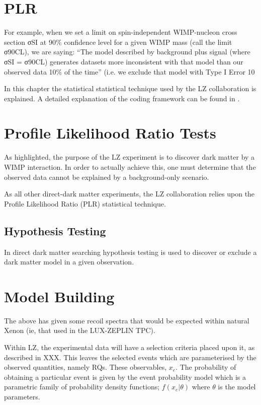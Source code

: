\section{PLR}
\par
For example, when we set a limit on spin-independent WIMP-nucleon cross section σSI at 90\% confidence level for a given WIMP mass (call the limit σ90CL), we are saying:
“The model described by background plus signal (where σSI  = σ90CL) generates datasets more inconsistent with that model than our observed data 10\% of the time” (i.e. we exclude that model with Type I Error 10%






\par
In this chapter the statistical statistical technique used by the LZ collaboration is explained.
A detailed explanation of the coding framework can be found in \cite{LZ_Ibles_LZStats_Thesis_ref}.

\section{Profile Likelihood Ratio Tests}
\par
As highlighted, the purpose of the LZ experiment is to discover dark matter by a WIMP interaction.
In order to actually achieve this, one must determine that the observed data cannot be explained by a background-only scenario.

\par
As all other direct-dark matter experiments, the LZ collaboration relies upon the Profile Likelihood Ratio (PLR) statistical technique.


\subsection{Hypothesis Testing}
\par
In direct dark matter searching hypothesis testing is used to discover or exclude a dark matter model in a given observation.



\section{Model Building}
\par
The above has given some recoil spectra that would be expected within natural Xenon (ie, that used in the LUX-ZEPLIN TPC).

\par
Within LZ, the experimental data will have a selection criteria placed upon it, as described in XXX.
This leaves the selected events which are parameterised by the observed quantities, namely RQs.
These observables, $x_{e}$.
The probability of obtaining a particular event is given by the event probability model which is a parametric family of probability density functions; $f(x_{e}|\theta)$ where $\theta$ is the model parameters.

